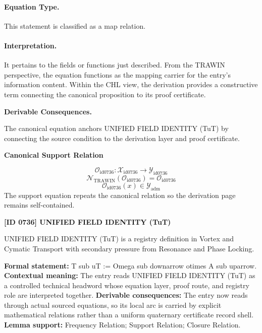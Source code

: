 \paragraph{Equation Type.}
This statement is classified as a map relation.

\paragraph{Interpretation.}
It pertains to the fields or functions just described. From the TRAWIN perspective, the equation functions as the mapping carrier for the entry’s information content. Within the CHL view, the derivation provides a constructive term connecting the canonical proposition to its proof certificate.

\par\vspace{0.35em}
\noindent\textbf{Derivable Consequences.}\quad
\begingroup
\footnotesize
\raggedright
The canonical equation anchors UNIFIED FIELD IDENTITY (TuT) by connecting the source condition to the derivation layer and proof certificate.
\par\endgroup

\noindent\textbf{Canonical Support Relation}\par
\[
\mathcal{O}_{\mathrm{id0736}}:\mathcal{X}_{\mathrm{id0736}}\longrightarrow\mathcal{Y}_{\mathrm{id0736}}
\]
\[
\mathcal{N}_{\mathrm{TRAWIN}}(\mathcal{O}_{\mathrm{id0736}})=\mathcal{O}_{\mathrm{id0736}}
\]
\[
\mathcal{O}_{\mathrm{id0736}}(x)\in\mathcal{Y}_{\mathrm{adm}}
\]
\noindent The support equation repeats the canonical relation so the derivation page remains self-contained.\par

\clearpage
\noindent\textbf{[ID 0736] UNIFIED FIELD IDENTITY (TuT)}\par
\vspace{0.35em}
\begingroup\small
{}
UNIFIED FIELD IDENTITY (TuT) is a registry definition in Vortex and Cymatic Transport with secondary pressure from Resonance and Phase Locking.

\begingroup\footnotesize\setlength{\emergencystretch}{3em}\sloppy
\textbf{Formal statement:} T sub uT := Omega sub downarrow otimes A sub uparrow. \textbf{Contextual meaning:} The entry reads UNIFIED FIELD IDENTITY (TuT) as a controlled technical headword whose equation layer, proof route, and registry role are interpreted together. \textbf{Derivable consequences:} The entry now reads through actual sourced equations, so its local arc is carried by explicit mathematical relations rather than a uniform quaternary certificate record shell. \textbf{Lemma support:} Frequency Relation; Support Relation; Closure Relation.\par
\endgroup

